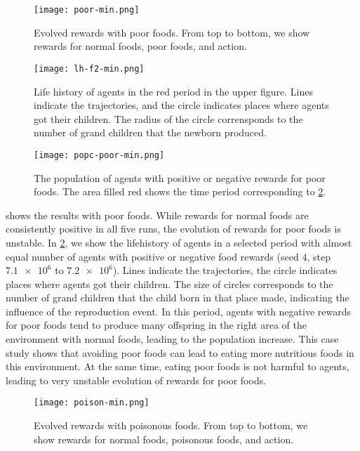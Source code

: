 \begin{figure}[t]
  \centering
  \texttt{[image: poor-min.png]}
  \caption{
    Evolved rewards with poor foods.
    From top to bottom, we show rewards for normal foods, poor foods, and action.
  }\label{figure:result-poor}
\end{figure}

\begin{figure}[!htb]
  \centering
  \texttt{[image: lh-f2-min.png]}
  \caption{
    Life history of agents in the red period in the upper figure.
    Lines indicate the trajectories, and the circle indicates places where agents got their children.
    The radius of the circle corrensponds to the number of grand children that the newborn produced.
  }\label{figure:lh-poor}
\end{figure}

\begin{figure}[!htb]
  \centering
  \texttt{[image: popc-poor-min.png]}
  \caption{
    The population of agents with positive or negative rewards for poor foods.
    The area filled red shows the time period corresponding to \cref{figure:lh-poor}.
  }\label{figure:pop-poor}
\end{figure}

 shows the results with poor foods. While rewards for normal foods are consistently positive in all five runs, the evolution of rewards for poor foods is unstable. In \cref{figure:lh-poor}, we show the lifehistory of agents in a selected period with almost equal number of agents with positive or negative food rewards (seed $4$, step $\num{7.1e6}$ to $\num{7.2e6}$). Lines indicate the trajectories, the circle indicates places where agents got their children. The size of circles corresponds to the number of grand children that the child born in that place made, indicating the influence of the reproduction event. In this period, agents with negative rewards for poor foods tend to produce many offspring in the right area of the environment with normal foods, leading to the population increase. This case study shows that avoiding poor foods can lead to eating more nutritious foods in this environment. At the same time, eating poor foods is not harmful to agents, leading to very unstable evolution of rewards for poor foods.

\begin{figure}[!ht]
  \centering
  \texttt{[image: poison-min.png]}
  \caption{
    Evolved rewards with poisonous foods.
    From top to bottom, we show rewards for normal foods, poisonous foods, and action.
  }\label{figure:result-poison}
\end{figure}

